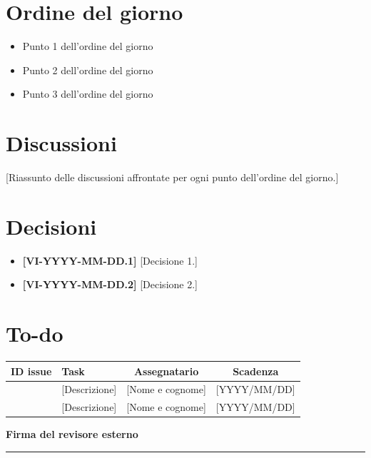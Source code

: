 \documentclass[11pt, a4paper]{article}
\begin{document}
\section{Ordine del giorno}
\begin{itemize}
    \item Punto 1 dell'ordine del giorno
    \item Punto 2 dell'ordine del giorno
    \item Punto 3 dell'ordine del giorno
\end{itemize}

\section{Discussioni}
[Riassunto delle discussioni affrontate per ogni punto dell'ordine del giorno.]

\section{Decisioni}
\begin{itemize}
    \item \textbf{[VI-YYYY-MM-DD.1]} [Decisione 1.]
    \item \textbf{[VI-YYYY-MM-DD.2]} [Decisione 2.]
\end{itemize}

\section{To-do}
\begin{table}[h]
    \centering
    \renewcommand{\arraystretch}{1.5}
    \begin{tabularx}{\textwidth}{|c|X|c|c|}
        \hline
        \rowcolor{gray!10} 
        \textbf{ID issue} & 
        \textbf{Task} & 
        \textbf{Assegnatario} & 
        \textbf{Scadenza} \\
        \hline
        [- o \#numero] & [Descrizione] & [Nome e cognome] & [YYYY/MM/DD] \\
        \hline
        [- o \#numero] & [Descrizione] & [Nome e cognome] & [YYYY/MM/DD] \\
        \hline
    \end{tabularx}
\end{table}

\vfill

\hfill
\begin{minipage}{0.4\textwidth}
    \centering
    \textbf{Firma del revisore esterno}\par
    \vspace{1.5cm}
    \rule{\textwidth}{0.4pt} %
\end{minipage}

\vspace{2cm} 
\end{document}
